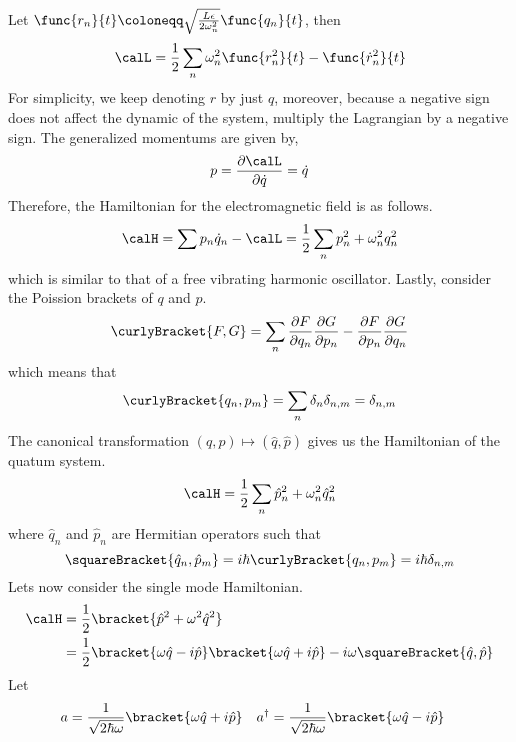 Let \(\func{r_n}{t} \coloneqq \sqrt{\frac{L\epsilon}{2\omega_n^2}} \func{q_n}{t}\), then 
\begin{equation*}
    \calL = \dfrac{1}{2} \sum_n  \omega_n^2 \func{r_n^2}{t} - \func{\dot{r}_n^2}{t}
\end{equation*}
For simplicity, we keep denoting \(r\) by just \(q\), moreover, because a negative sign does not affect the dynamic of the system, multiply the Lagrangian by a negative sign. The generalized momentums are given by,
\begin{equation*}
    p = \dfrac{\partial \calL}{\partial \dot{q}} = \dot{q}
\end{equation*}
Therefore, the Hamiltonian for the electromagnetic field is as follows.
\begin{equation*}
    \calH = \sum p_n \dot{q}_n - \calL = \dfrac{1}{2} \sum_n p_n^2 + \omega_n^2 q_n^2
\end{equation*}
which is similar to that of a free vibrating harmonic oscillator. Lastly, consider the Poission brackets of \(q\) and \(p\).
\begin{equation*}
    \curlyBracket{F,G} = \sum_n \dfrac{\partial F}{\partial q_n} \dfrac{\partial G}{\partial p_n} - \dfrac{\partial F}{\partial p_n} \dfrac{\partial G}{\partial q_n} 
\end{equation*}
which means that 
\begin{equation*}
    \curlyBracket{q_n,p_m} = \sum_n \delta_n \delta_{n,m} = \delta_{n,m} 
\end{equation*}
The canonical transformation \((q,p) \mapsto (\hat{q}, \hat{p})\) gives us the Hamiltonian of the quatum system.
\begin{equation*}
    \calH = \dfrac{1}{2} \sum_n \hat{p}_n^2 + \omega_n^2 \hat{q}_n^2
\end{equation*}
where \(\hat{q}_n\) and \(\hat{p}_n\) are Hermitian operators such that 
\begin{equation*}
    \squareBracket{\hat{q}_n, \hat{p}_m} = i\hbar\curlyBracket{q_n, p_m}= i\hbar \delta_{n,m}
\end{equation*}
Lets now consider the single mode Hamiltonian. 
\begin{align*}
    \calH &= \dfrac{1}{2} \bracket{\hat{p}^2 + \omega^2 \hat{q}^2}\\
    &= \dfrac{1}{2}\bracket{\omega \hat{q} -i \hat{p}}\bracket{\omega \hat{q} + i \hat{p}} - i\omega \squareBracket{\hat{q}, \hat{p}}
\end{align*}
Let 
\begin{align*}
    a &= \dfrac{1}{\sqrt{2\hbar \omega }}\bracket{\omega \hat{q} +i \hat{p}} &
    a^{\dagger} &= \dfrac{1}{\sqrt{2\hbar \omega }}\bracket{\omega \hat{q} -i \hat{p}}
\end{align*}
